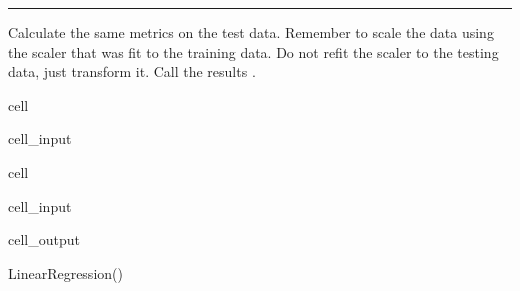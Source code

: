 \documentclass[letterpaper,10pt,english]{sphinxmanual}
\begin{document}
\bigskip\hrule\bigskip


\sphinxAtStartPar
{}

\sphinxAtStartPar
Calculate the same metrics on the test data. Remember to scale the  data using the scaler that was fit to the training data. Do not refit the scaler to the testing data, just transform it. Call the results .

\begin{sphinxuseclass}{cell}
\begin{sphinxuseclass}{cell_input}
\begin{sphinxVerbatim}[commandchars=\\\{\}]
  
  
\end{sphinxVerbatim}

\end{sphinxuseclass}
\end{sphinxuseclass}
\begin{sphinxuseclass}{cell}
\begin{sphinxuseclass}{cell_input}
\begin{sphinxVerbatim}[commandchars=\\\{\}]
  
\end{sphinxVerbatim}

\end{sphinxuseclass}
\begin{sphinxuseclass}{cell_output}
\begin{sphinxVerbatim}[commandchars=\\\{\}]
LinearRegression()
\end{sphinxVerbatim}

\end{sphinxuseclass}
\end{sphinxuseclass}
\end{document}
